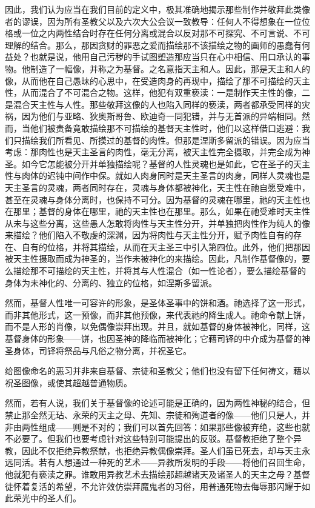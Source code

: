 因此，我们认为应当在我们目前的定义中，极其准确地揭示那些制作并敬拜此类像者的谬误，因为所有圣教父以及六次大公会议一致教导：任何人不得想象在一位位格或一位之内两性结合时存在任何分离或混合以反对那不可探究、不可言说、不可理解的结合。那么，那因贪财的罪恶之爱而描绘那不该描绘之物的画师的愚蠢有何益处？也就是说，他用自己污秽的手试图塑造那应当只在心中相信、用口承认的事物。他制造了一幅像，并称之为基督。之名意指天主和人。因此，那是天主和人的像，从而他在自己愚昧的心思中，在受造肉身的再现中，描绘了那不可描绘的天主性，从而混合了不可混合之物。这样，他犯有双重亵渎：一是制作天主性的像，二是混合天主性与人性。那些敬拜这像的人也陷入同样的亵渎，两者都承受同样的灾祸，因为他们与亚略、狄奥斯哥鲁、欧迪奇一同犯错，并与无首派的异端相同。然而，当他们被责备竟敢描绘那不可描绘的基督天主性时，他们以这样借口逃避：我们只描绘我们所看见、所摸过的基督的肉性。但那是涅斯多留派的错误。因为应当考虑：那肉性也是天主圣言的肉性，毫无分离，被天主性完全摄取，并完全成为神圣。如今它怎能被分开并单独描绘呢？基督的人性灵魂也是如此，它在圣子的天主性与肉体的迟钝中间作中保。就如人肉身同时是天主圣言的肉身，同样人灵魂也是天主圣言的灵魂，两者同时存在，灵魂与身体都被神化，天主性在祂自愿受难中，甚至在灵魂与身体分离时，也保持不可分。因为基督的灵魂在哪里，祂的天主性也在那里；基督的身体在哪里，祂的天主性也在那里。那么，如果在祂受难时天主性从未与这些分离，这些愚人怎敢将肉性与天主性分开，并单独把肉性作为纯人的像来描绘？他们陷入不敬虔的深渊，因为将肉性与天主性分开，赋予肉性自有的存在、自有的位格，并将其描绘，从而在天主圣三中引入第四位。此外，他们把那因被天主性摄取而成为神圣的，当作未被神化的来描绘。因此，凡制作基督像的，要么描绘那不可描绘的天主性，并将其与人性混合（如一性论者），要么描绘基督的身体为未神化的、分离的、独立的位格，如涅斯多留派。\par

然而，基督人性唯一可容许的形象，是圣体圣事中的饼和酒。祂选择了这一形式，而非其他形式，这一预像，而非其他预像，来代表祂的降生成人。祂命令献上饼，而不是人形的肖像，以免偶像崇拜出现。并且，就如基督的身体被神化，同样，这基督身体的形象——饼，也因圣神的降临而被神化；它藉司铎的中介成为基督的神圣身体，司铎将祭品与凡俗之物分离，并祝圣它。\par

给图像命名的恶习并非来自基督、宗徒和圣教父；他们也没有留下任何祷文，藉以祝圣图像，或使其超越普通物质。\par

然而，若有人说，我们关于基督像的论述可能是正确的，因为两性神秘的结合，但禁止那全然无玷、永荣的天主之母、先知、宗徒和殉道者的像——他们只是人，并非由两性组成——则是不对的；我们可以首先回答：如果那些像被弃绝，这些也就不必要了。但我们也要考虑针对这些特别可能提出的反驳。基督教拒绝了整个异教，因此不仅拒绝异教祭献，也拒绝异教偶像崇拜。圣人们虽已死去，却与天主永远同活。若有人想通过一种死的艺术——异教所发明的手段——将他们召回生命，他就犯有亵渎之罪。谁敢用异教艺术去描绘那超越诸天及诸圣人的天主之母？基督徒怀着复活的希望，不允许效仿崇拜魔鬼者的习俗，用普通死物去侮辱那闪耀于如此荣光中的圣人们。\par

